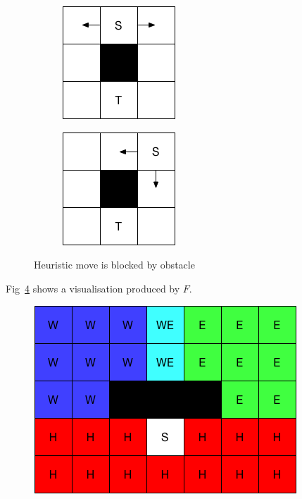 \documentclass{article}
\begin{document}
\begin{itemize}
    \begin{figure}[h]
      \centering
      \begin{subfigure}{.35\textwidth}
      \centering
        \includegraphics[width=.6\textwidth]{./hmove3.png}
        \caption{}
        \label{hmove3_1}
      \end{subfigure}%
      \begin{subfigure}{.35\textwidth}
      \centering
        \includegraphics[width=.6\textwidth]{./hmove3_2.png}
        \caption{}
        \label{hmove3_2}
      \end{subfigure}
      \caption{\small Heuristic move is blocked by obstacle}
      \label{hmove3}
    \end{figure}
  \end{itemize}

Fig~\ref{grid1} shows a visualisation produced by $F$.

\begin{figure}[b]
  \centering
  \includegraphics[width=.5\textwidth]{./grid.png}
  \caption{}
  \label{grid1}
\end{figure}
\end{document}

